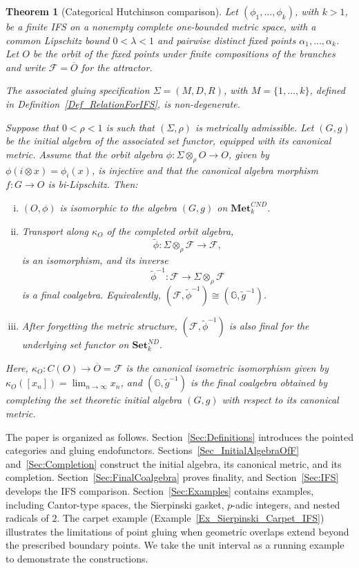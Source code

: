 \documentclass{sn-jnl}%
\theoremstyle{thmstyleone}%
\newtheorem{theorem}{Theorem}%
\theoremstyle{thmstyletwo}%
\theoremstyle{thmstylethree}%
\newcommand{\setnd}{\mathbf{Set}_{k}^{ND}}
\newcommand{\mcnd}{\mathbf{Met}_{k}^{CND}}
\newcommand{\M}{\Sigma}
\newcommand{\Fw}{\M\otimes_{\w}}
\newcommand{\G}{\mathbb{G}}
\newcommand{\g}{\tilde{g}^{-1}}
\newcommand{\f}{\phi}
\newcommand{\w}{\rho}
\begin{document}
\begin{theorem}[Categorical Hutchinson comparison]
\label{Thm_F_isTheFinalCoalgebra}
Let $(\f_1,\ldots,\f_k)$, with $k>1$, be a finite IFS on a nonempty complete one-bounded metric space, with a common Lipschitz bound $0<\lambda<1$ and pairwise distinct fixed points $\alpha_1,\ldots,\alpha_k$. Let $O$ be the orbit of the fixed points under finite compositions of the branches and write $\mathcal F=\overline O$ for the attractor.

The associated gluing specification $\Sigma=(M,D,R)$, with $M=\{1,\ldots,k\}$, defined in Definition~\ref{Def_RelationForIFS}, is non-degenerate.

Suppose that $0<\rho<1$ is such that $(\Sigma,\rho)$ is metrically admissible. Let $(G,g)$ be the initial algebra of the associated set functor, equipped with its canonical metric. Assume that the orbit algebra $\f:\Fw O\longrightarrow O$, given by $\f(i\otimes x)=\f_i(x)$, is injective and that the canonical
algebra morphism $f:G\longrightarrow O$ is bi-Lipschitz. Then:
    \begin{enumerate}[(i)]
        \item $(O,\f)$ is isomorphic to the algebra $(G,g)$ on $\mcnd$.
       \item Transport along $\kappa_O$ of the completed orbit algebra,
        \begin{equation} 
        \nonumber
            \widetilde{\f} : \Fw\mathcal F\longrightarrow\mathcal F,
        \end{equation}
        is an isomorphism, and its inverse
        \begin{equation} 
        \nonumber
            {\widetilde{\f}}^{-1}: \mathcal F\longrightarrow\Fw\mathcal F
        \end{equation}
        is a final coalgebra. Equivalently, $(\mathcal F,\widetilde{\f}^{-1}) \cong (\G,\g)$.
        \item  After forgetting the metric structure, $(\mathcal F,\widetilde{\f}^{-1})$ is also final for the underlying set functor on $\setnd$.
    \end{enumerate}
Here, $\kappa_O:C(O)\longrightarrow \overline O=\mathcal F$ is the canonical isometric isomorphism given by $\kappa_O([x_n])=\lim_{n\to\infty}x_n$, and $(\G,\g)$ is the final coalgebra obtained by completing the set theoretic initial algebra $(G,g)$ with respect to its canonical metric.
\end{theorem}

The paper is organized as follows.  Section~\ref{Sec:Definitions} introduces the pointed categories and gluing endofunctors. Sections~\ref{Sec_InitialAlgebraOfF} and~\ref{Sec:Completion} construct the initial algebra, its canonical metric, and its completion. Section~\ref{Sec:FinalCoalgebra} proves finality, and Section~\ref{Sec:IFS} develops the IFS comparison. Section~\ref{Sec:Examples} contains examples, including Cantor-type spaces, the Sierpinski gasket, $p$-adic integers, and nested radicals of $2$. The carpet example (Example~\ref{Ex_Sierpinski_Carpet_IFS}) illustrates the limitations of point gluing when geometric overlaps extend beyond the prescribed boundary points. We take the unit interval as a running example to demonstrate the constructions.
\end{document}
